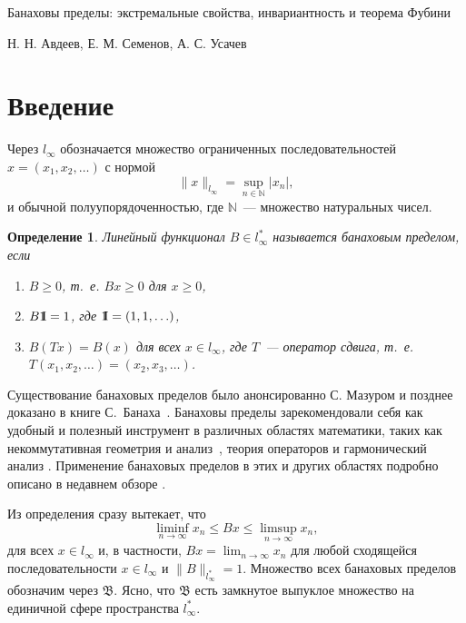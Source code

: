 \documentclass[12pt]{article}
\newcommand{\emm}{\mathrm{1\hspace{-0.3em} I}}
\newtheorem{dfn}[thm]{Определение}
\begin{document}
\begin{center}
{\Large Банаховы пределы: экстремальные свойства, инвариантность и теорема Фубини}

Н. Н. Авдеев, Е. М. Семенов, А. С. Усачев
\end{center}

\begin{abstract}
Банаховым пределом на пространстве всех ограниченных вещественнозначных последовательностей называется положительный, нормированный линейный функционал, инвариантный относительно сдвига. В работе изучаются необычные свойства банаховых пределов такие как мультипликативность и справедливость теоремы Фубини. Также изучается подмножество банаховых пределов, инвариантных относительно операторов растяжения.
\end{abstract}


\section{Введение}


Через $l_\infty$ обозначается множество ограниченных
последовательностей $x=(x_1,x_2,\ldots)$ с нормой
\[
 \|x\|_{l_\infty}=\sup_{n\in \mathbb N}|x_n|,
\]
 и обычной полуупорядоченностью, где ${\mathbb N}$~--- множество натуральных чисел.

\begin{dfn}
Линейный функционал $B\in l_\infty^*$ называется банаховым пределом,
если
\begin{enumerate}
    \item $B\geq0$, т.~е. $Bx \geq 0$ для $x \geq 0$,
    \item $B\emm=1$, где $\emm =(1,1,\ldots)$,
    \item $B(Tx)=B(x)$ для всех $x\in l_\infty$, где $T$~---
    оператор сдвига, т.~е. $T(x_1,x_2,\ldots)=(x_2,x_3,\ldots)$.
\end{enumerate}
\end{dfn}

Существование банаховых пределов было анонсированно С. Мазуром \cite{Mazur} и позднее доказано в книге С.~Банаха~\cite{B}.
Банаховы пределы зарекомендовали себя как удобный и полезный инструмент в различных областях математики, таких как некоммутативная геометрия и анализ~\cite{CS}, теория операторов \cite{Sem_Sht} и гармонический анализ \cite{Ast_Sem, SU, U2}. Применение банаховых пределов в этих и других областях подробно описано в недавнем обзоре \cite{SSU_survey}.

Из определения сразу вытекает, что
$$\liminf_{n\to\infty}x_n \le Bx \le \limsup_{n\to\infty}x_n,$$
для всех $x\in l_\infty$ и, в частности,
 $\displaystyle
Bx=\lim_{n\to\infty}x_n$ для любой сходящейся
последовательности $x\in l_\infty$ и $\|B\|_{l_\infty^*}=1$. Множество всех банаховых пределов обозначим
 через $\mathfrak{B}$. Ясно, что $\mathfrak{B}$ есть замкнутое выпуклое
множество на единичной сфере пространства $l_\infty^*$.
\end{document}
